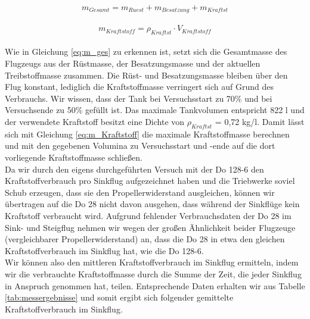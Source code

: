 \begin{equation}\label{eq:m_ges}
m_{Gesamt} = m_{Ruest} + m_{Besatzung} + m_{Kraftst}
\end{equation}
\\
\begin{equation}\label{eq:m_Kraftstoff}
m_{Kraftstoff} = \rho_{Kraftst} \cdot V_{Kraftstoff}
\end{equation}
\\
\noindent Wie in Gleichung \ref{eq:m_ges} zu erkennen ist, setzt sich die Gesamtmasse des Flugzeugs aus der Rüstmasse, der Besatzungsmasse und der aktuellen Treibstoffmasse zusammen. Die Rüst- und Besatzungsmasse bleiben über den Flug konstant, lediglich die Kraftstoffmasse verringert sich auf Grund des Verbrauchs. Wir wissen, dass der Tank bei Versuchsstart zu 70\% und bei Versuchsende zu 50\% gefüllt ist. Das maximale Tankvolumen entspricht 822 {l} und der verwendete Kraftstoff besitzt eine Dichte von $\rho_{Kraftst}$ = 0,72 {kg/l}. Damit lässt sich mit Gleichung \ref{eq:m_Kraftstoff} die maximale Kraftstoffmasse berechnen und mit den gegebenen Volumina zu Versuchsstart und -ende auf die dort vorliegende Kraftstoffmasse schließen.
\\
Da wir durch den eigens durchgeführten Versuch mit der Do 128-6 den Kraftstoffverbrauch pro Sinkflug aufgezeichnet haben und die Triebwerke soviel Schub erzeugen, dass sie den Propellerwiderstand ausgleichen, können wir übertragen auf die Do 28 nicht davon ausgehen, dass während der Sinkflüge kein Kraftstoff verbraucht wird. Aufgrund fehlender Verbrauchsdaten der Do 28 im Sink- und Steigflug nehmen wir wegen der großen Ähnlichkeit beider Flugzeuge (vergleichbarer Propellerwiderstand) an, dass die Do 28 in etwa den gleichen Kraftstoffverbrauch im Sinkflug hat, wie die Do 128-6.
\\
Wir können also den mittleren Kraftstoffverbrauch im Sinkflug ermitteln, indem wir die verbrauchte Kraftstoffmasse durch die Summe der Zeit, die jeder Sinkflug in Anspruch genommen hat, teilen. Entsprechende Daten erhalten wir aus Tabelle \ref{tab:messergebnisse} und somit ergibt sich folgender gemittelte Kraftstoffverbrauch im Sinkflug.

